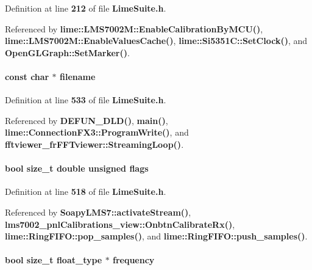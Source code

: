 Definition at line {\bf 212} of file {\bf Lime\+Suite.\+h}.



Referenced by {\bf lime\+::\+L\+M\+S7002\+M\+::\+Enable\+Calibration\+By\+M\+C\+U()}, {\bf lime\+::\+L\+M\+S7002\+M\+::\+Enable\+Values\+Cache()}, {\bf lime\+::\+Si5351\+C\+::\+Set\+Clock()}, and {\bf Open\+G\+L\+Graph\+::\+Set\+Marker()}.

\paragraph[{filename}]{\setlength{\rightskip}{0pt plus 5cm}const char $\ast$ filename}\label{group__FN__HIGH__LVL_ga28849770c8bfeb04039d7dd29d4dfa35}


Definition at line {\bf 533} of file {\bf Lime\+Suite.\+h}.



Referenced by {\bf D\+E\+F\+U\+N\+\_\+\+D\+L\+D()}, {\bf main()}, {\bf lime\+::\+Connection\+F\+X3\+::\+Program\+Write()}, and {\bf fftviewer\+\_\+fr\+F\+F\+Tviewer\+::\+Streaming\+Loop()}.

\paragraph[{flags}]{\setlength{\rightskip}{0pt plus 5cm}bool size\+\_\+t double unsigned flags}\label{group__FN__HIGH__LVL_ga73c01a58a13194faf47a78ed0917247d}


Definition at line {\bf 518} of file {\bf Lime\+Suite.\+h}.



Referenced by {\bf Soapy\+L\+M\+S7\+::activate\+Stream()}, {\bf lms7002\+\_\+pnl\+Calibrations\+\_\+view\+::\+Onbtn\+Calibrate\+Rx()}, {\bf lime\+::\+Ring\+F\+I\+F\+O\+::pop\+\_\+samples()}, and {\bf lime\+::\+Ring\+F\+I\+F\+O\+::push\+\_\+samples()}.

\paragraph[{frequency}]{\setlength{\rightskip}{0pt plus 5cm}bool size\+\_\+t {\bf float\+\_\+type} $\ast$ frequency}\label{group__FN__HIGH__LVL_ga0d6d2a17845b8d678835c742f5eb6ac4}


